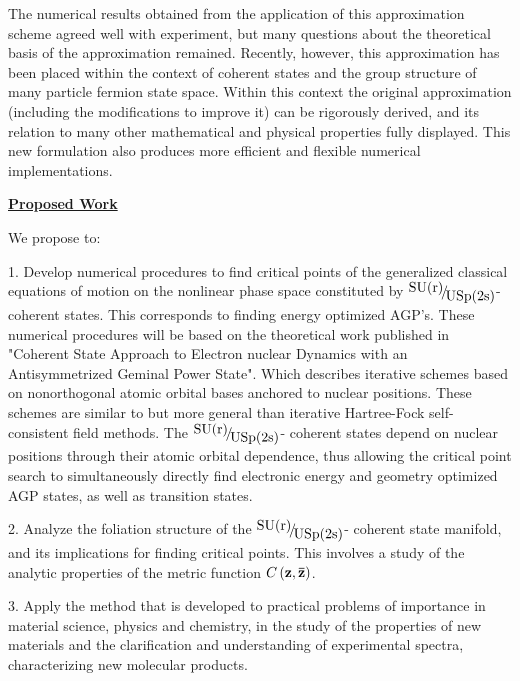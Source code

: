 \documentclass{amsart}
\begin{document}
The numerical results obtained from the application of this approximation
scheme agreed well with experiment, but many questions about the theoretical
basis of the approximation remained. Recently, however, this approximation
has been placed within the context of coherent states and the group
structure of many particle fermion state space. Within this context the
original approximation (including the modifications to improve it) can be
rigorously derived, and its relation to many other mathematical and physical
properties fully displayed. This new formulation also produces more
efficient and flexible numerical implementations.

\underline {\textbf{Proposed Work}}

We propose to:

1. Develop numerical procedures to find critical points of the generalized
classical equations of motion on the nonlinear phase space constituted by
$\raise0.7ex\hbox{${\mbox{SU(r)}}$} \!\mathord{\left/ {\vphantom
{{\mbox{SU(r)}}
{\mbox{USp(2s)}}}}\right.\kern-\nulldelimiterspace}\!\lower0.7ex\hbox{${\mbox{USp(2s)}}$}$-
coherent states. This corresponds to finding energy optimized AGP's. These
numerical procedures will be based on the theoretical work published in
"Coherent State Approach to Electron nuclear Dynamics with an
Antisymmetrized Geminal Power State". Which describes iterative schemes
based on nonorthogonal atomic orbital bases anchored to nuclear positions.
These schemes are similar to but more general than iterative Hartree-Fock
self-consistent field methods. The $\raise0.7ex\hbox{${\mbox{SU(r)}}$}
\!\mathord{\left/ {\vphantom {{\mbox{SU(r)}}
{\mbox{USp(2s)}}}}\right.\kern-\nulldelimiterspace}\!\lower0.7ex\hbox{${\mbox{USp(2s)}}$}$-
coherent states depend on nuclear positions through their atomic orbital
dependence, thus allowing the critical point search to simultaneously
directly find electronic energy and geometry optimized AGP states, as well
as transition states.

2. Analyze the foliation structure of the
$\raise0.7ex\hbox{${\mbox{SU(r)}}$} \!\mathord{\left/ {\vphantom
{{\mbox{SU(r)}}
{\mbox{USp(2s)}}}}\right.\kern-\nulldelimiterspace}\!\lower0.7ex\hbox{${\mbox{USp(2s)}}$}$-
coherent state manifold, and its implications for finding critical points.
This involves a study of the analytic properties of the metric function
$C\left( {{\rm {\bf z}},{\rm {\bf \bar {z}}}} \right)$.

3. Apply the method that is developed to practical problems of importance in
material science, physics and chemistry, in the study of the properties of
new materials and the clarification and understanding of experimental
spectra, characterizing new molecular products.
\end{document}
